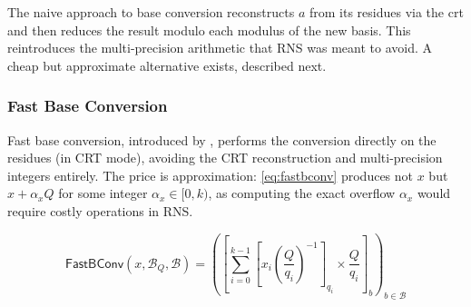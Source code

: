 The naive approach to base conversion reconstructs $a$ from its residues via the \gls{crt} and then reduces the result modulo each modulus of the new basis. This reintroduces the multi-precision arithmetic that RNS was meant to avoid. A cheap but approximate alternative exists, described next.



\subsubsection{Fast Base Conversion}
Fast base conversion, introduced by \cite{cryptoeprint:2016/510}, performs the conversion directly on the residues (in CRT mode), avoiding the CRT reconstruction and multi-precision integers entirely. The price is approximation: \eqref{eq:fastbconv} produces not $x$ but $x + \alpha_x Q$ for some integer $\alpha_x \in [0, k)$, as computing the exact overflow $\alpha_x$ would require costly operations in RNS.

\begin{equation}
    \label{eq:fastbconv}
    \mathsf{FastBConv}(x, \mathcal{B}_Q, \mathcal{B}) = \left(\left[\sum_{i=0}^{k-1}\left[x_i\left(\frac{Q}{q_i}\right)^{-1}\right]_{q_i} \times \frac{Q}{q_i}\right]_b\right)_{b\in \mathcal{B}}
\end{equation}


